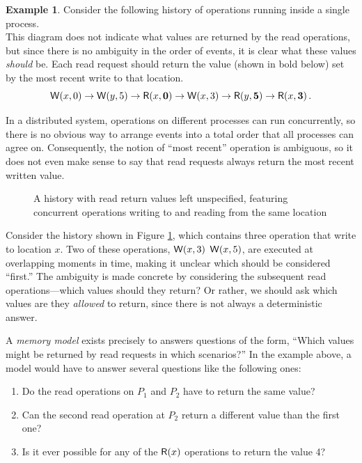 \documentclass[]             %
{NASA}                       %
\theoremstyle{definition}
\newtheorem{example}[theorem]{Example}
\begin{document}
\begin{example}
  Consider the following history of operations running inside a single process.
  \[\]
  This diagram does not indicate what values are returned by the read
  operations, but since there is no ambiguity in the order of events,
  it is clear what these values \emph{should} be. Each read request
  should return the value (shown in bold below) set by the most recent
  write to that location.
  \[ \mathsf{W}\!\left(x, 0\right) \to \mathsf{W}\!\left(y, 5\right) \to \mathsf{R}\!\left(x, \textbf{0}\right) \to \mathsf{W}\!\left(x, 3\right) \to \mathsf{R}\!\left(y, \textbf{5}\right) \to \mathsf{R}\!\left(x, \textbf{3}\right). \]
\end{example}

In a distributed system, operations on different processes can run
concurrently, so there is no obvious way to arrange events into a
total order that all processes can agree on. Consequently, the notion
of ``most recent'' operation is ambiguous, so it does not even make
sense to say that read requests always return the most recent written
value.

\begin{figure}[h]
  
  \caption{A history with read return values left unspecified,
    featuring concurrent operations writing to and reading from the
    same location}
  \label{fig:dsm-example-2}
\end{figure}


Consider the history shown in Figure \ref{fig:dsm-example-2}, which
contains three operation that write to location $x$. Two of these
operations, $\mathsf{W}\!\left(x, 3\right)$ $\mathsf{W}\!\left(x, 5\right)$, are executed at
overlapping moments in time, making it unclear which should be
considered ``first.'' The ambiguity is made concrete by considering
the subsequent read operations---which values should they return? Or
rather, we should ask which values are they \emph{allowed} to return,
since there is not always a deterministic answer.

A \emph{memory model} exists precisely to answers questions of the
form, ``Which values might be returned by read requests in which
scenarios?'' In the example above, a model would have to answer
several questions like the following ones:
\begin{enumerate}
\item Do the read operations on $P_1$ and $P_2$ have to return the same value?
\item Can the second read operation at $P_2$ return a different value
  than the first one?
\item Is it ever possible for any of the $\mathsf{R}\!\left(x\right)$ operations to
  return the value 4?
\end{enumerate}
\end{document}
